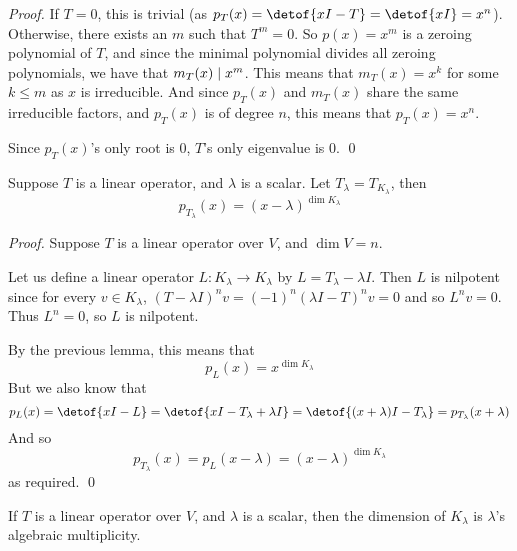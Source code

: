 \begin{proof}

    If $T=0$, this is trivial (as $p_T(x)=\detof{xI-T}=\detof{xI}=x^n$).
    Otherwise, there exists an $m$ such that $T^m=0$.
    So $p(x)=x^m$ is a zeroing polynomial of $T$, and since the minimal polynomial divides all zeroing polynomials, we have that $m_T(x)\mid x^m$.
    This means that $m_T(x)=x^k$ for some $k\leq m$ as $x$ is irreducible.
    And since $p_T(x)$ and $m_T(x)$ share the same irreducible factors, and $p_T(x)$ is of degree $n$, this means that $p_T(x)=x^n$.

    Since $p_T(x)$'s only root is $0$, $T$'s only eigenvalue is $0$.
    \qed

\end{proof}

\begin{lemm*}

    Suppose $T$ is a linear operator, and $\lambda$ is a scalar.
    Let $T_\lambda=T_{K_\lambda}$, then
    \[ p_{T_\lambda}(x) = (x-\lambda)^{\dim K_\lambda} \]

\end{lemm*}

\begin{proof}

    Suppose $T$ is a linear operator over $V$, and $\dim V=n$.

    Let us define a linear operator $L\colon K_\lambda\to K_\lambda$ by $L=T_\lambda-\lambda I$.
    Then $L$ is nilpotent since for every $v\in K_\lambda$, $(T-\lambda I)^nv=(-1)^n(\lambda I-T)^nv=0$ and so $L^nv=0$.
    Thus $L^n=0$, so $L$ is nilpotent.

    By the previous lemma, this means that
    \[ p_L(x) = x^{\dim K_\lambda} \]
    But we also know that
    \[ p_L(x) = \detof{xI-L} = \detof{xI-T_\lambda+\lambda I} = \detof{(x+\lambda)I-T_\lambda} = p_{T_\lambda}(x+\lambda) \]
    And so
    \[ p_{T_\lambda}(x) = p_L(x-\lambda) = (x-\lambda)^{\dim K_\lambda} \]
    as required.
    \qed

\end{proof}

\begin{lemm*}

    If $T$ is a linear operator over $V$, and $\lambda$ is a scalar, then the dimension of $K_\lambda$ is $\lambda$'s algebraic multiplicity.

\end{lemm*}

